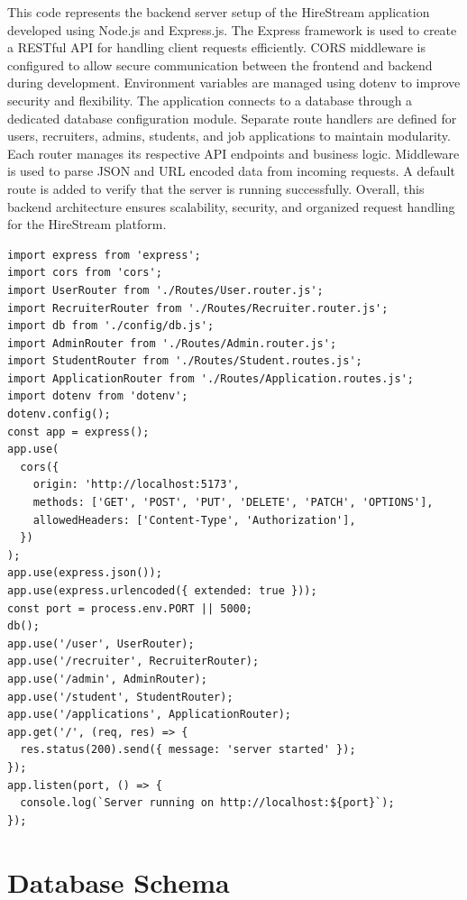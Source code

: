 \documentclass[a4paper, 12pt]{report}
\begin{document}
This code represents the backend server setup of the HireStream application developed using Node.js and Express.js. The Express framework is used to create a RESTful API for handling client requests efficiently. CORS middleware is configured to allow secure communication between the frontend and backend during development. Environment variables are managed using dotenv to improve security and flexibility. The application connects to a database through a dedicated database configuration module. Separate route handlers are defined for users, recruiters, admins, students, and job applications to maintain modularity. Each router manages its respective API endpoints and business logic. Middleware is used to parse JSON and URL encoded data from incoming requests. A default route is added to verify that the server is running successfully. Overall, this backend architecture ensures scalability, security, and organized request handling for the HireStream platform.

\noindent \begin{lstlisting}
import express from 'express';
import cors from 'cors';
import UserRouter from './Routes/User.router.js';
import RecruiterRouter from './Routes/Recruiter.router.js';
import db from './config/db.js';
import AdminRouter from './Routes/Admin.router.js';
import StudentRouter from './Routes/Student.routes.js';
import ApplicationRouter from './Routes/Application.routes.js';
import dotenv from 'dotenv';
dotenv.config();
const app = express();
app.use(
  cors({
    origin: 'http://localhost:5173',
    methods: ['GET', 'POST', 'PUT', 'DELETE', 'PATCH', 'OPTIONS'],
    allowedHeaders: ['Content-Type', 'Authorization'],
  })
);
app.use(express.json());
app.use(express.urlencoded({ extended: true }));
const port = process.env.PORT || 5000;
db();
app.use('/user', UserRouter);
app.use('/recruiter', RecruiterRouter);
app.use('/admin', AdminRouter);
app.use('/student', StudentRouter);
app.use('/applications', ApplicationRouter);
app.get('/', (req, res) => {
  res.status(200).send({ message: 'server started' });
});
app.listen(port, () => {
  console.log(`Server running on http://localhost:${port}`);
});

\end{lstlisting}

\section{\textbf{Database Schema}}
\end{document}
